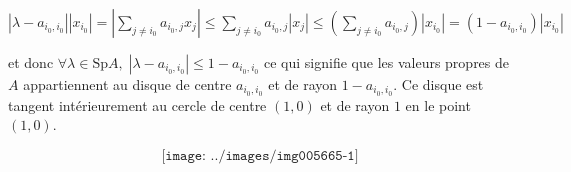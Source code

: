 {\begin{enumerate}
{\begin{center}
$|\lambda-a_{i_0,i_0}||x_{i_0}|=\left|\sum_{j\neq i_0}^{}a_{i_0,j}x_j\right|\leqslant\sum_{j\neq i_0}^{}a_{i_0,j}|x_j|\leqslant \left(\sum_{j\neq i_0}^{}a_{i_0,j}\right)|x_{i_0}|=(1-a_{i_0,i_0})|x_{i_0}|$
\end{center}

et donc $\forall\lambda\in\text{Sp}A,\;|\lambda-a_{i_0,i_0}|\leqslant1-a_{i_0,i_0}$ ce qui signifie que les valeurs propres de $A$ appartiennent au disque de centre $a_{i_0,i_0}$ et de rayon $1-a_{i_0,i_0}$. Ce disque est tangent intérieurement au cercle de centre $(1,0)$ et de rayon $1$ en le point $(1,0)$.


$$\texttt{[image: ../images/img005665-1]}$$}
\end{enumerate}
}
